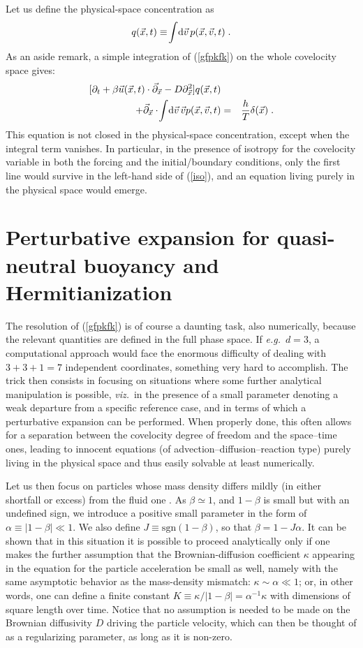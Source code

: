 Let us define the physical-space concentration as
\begin{equation} \label{phys}
 q(\vec{x},t)\equiv\!\int\!\mathrm{d}\vec{v}\,p(\vec{x},\vec{v},t)\;.
\end{equation}
As an aside remark, a simple integration of (\ref{gfpkfk}) on the whole covelocity space gives:
\begin{eqnarray} \label{iso}
 [\partial_t+\beta\vec{u}(\vec{x},t)\cdot\vec{\partial}_{\vec{x}}-D\partial^2_{\vec{x}}]q(\vec{x},t)&&\nonumber\\
 +\vec{\partial}_{\vec{x}}\cdot\!\int\!\mathrm{d}\vec{v}\,\vec{v}p(\vec{x},\vec{v},t)&=&\frac{h}{T}\delta(\vec{x})\;.
\end{eqnarray}
This equation is not closed in the physical-space concentration, except when the integral term vanishes.
In particular, in the presence of isotropy for the covelocity variable in both the forcing and the initial/boundary conditions,
only the first line would survive in the left-hand side of (\ref{iso}), and an equation living purely in the physical space would emerge.
%
\section{Perturbative expansion for quasi-neutral buoyancy and Hermitianization} \label{sez}
%
The resolution of (\ref{gfpkfk}) is of course a daunting task, also numerically, because the relevant quantities are defined in the full phase space.
If \emph{e.g.}\ $d=3$, a computational approach would face the enormous difficulty of dealing with $3+3+1=7$ independent coordinates,
something very hard to accomplish. The trick then consists in focusing on situations where some further analytical manipulation is possible,
\emph{viz.}\ in the presence of a small parameter denoting a weak departure from a specific reference case, and in terms of which a perturbative expansion
can be performed. When properly done, this often allows for a separation between the covelocity degree of freedom and the space--time ones,
leading to innocent equations (of advection--diffusion--reaction type) purely living in the physical space and thus easily solvable at least numerically.

Let us then focus on particles whose mass density differs mildly (in either shortfall or excess) from the fluid one \cite{BCPP00,MFS07,SH08,MAG17,MAMGM17}.
As $\beta\simeq1$, and $1-\beta$ is small but with an undefined sign, we introduce a positive small parameter in the form of $\alpha\equiv|1-\beta|\ll1$.
We also define $J\equiv\mathrm{sgn}(1-\beta)$, so that $\beta=1-J\alpha$. It can be shown that in this situation it is possible to proceed analytically
only if one makes the further assumption that the Brownian-diffusion coefficient $\kappa$ appearing in the equation for the particle acceleration be small
as well, namely with the same asymptotic behavior as the mass-density mismatch: $\kappa\sim\alpha\ll1$; or, in other words, one can define a finite
constant $K\equiv\kappa/|1-\beta|=\alpha^{-1}\kappa$ with dimensions of square length over time. Notice that no assumption is needed to be made on the
Brownian diffusivity $D$ driving the particle velocity, which can then be thought of as a regularizing parameter, as long as it is non-zero.
 
